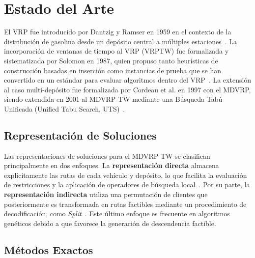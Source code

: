 \documentclass[letter, 10pt, dvipdfmx]{article}
\begin{document}
\section{Estado del Arte}

El VRP fue introducido por Dantzig y Ramser en 1959 en el contexto de la distribución de gasolina desde un depósito central a múltiples estaciones~\cite{Dantzig1959}.
La incorporación de ventanas de tiempo al VRP (VRPTW) fue formalizada y sistematizada por Solomon en 1987, quien propuso tanto heurísticas de construcción basadas en inserción
como instancias de prueba que se han convertido en un estándar para evaluar algoritmos dentro del VRP~\cite{Solomon1987}.
La extensión al caso multi-depósito fue formalizada por Cordeau et al. en 1997 con el MDVRP, siendo extendida en 2001 al MDVRP-TW mediante una Búsqueda Tabú Unificada (Unified Tabu Search, UTS)~\cite{Cordeau2001}.

\subsection{Representación de Soluciones}

Las representaciones de soluciones para el MDVRP-TW se clasifican principalmente en dos enfoques.
La \textbf{representación directa} almacena explícitamente las rutas de cada vehículo y depósito, lo que facilita la
evaluación de restricciones y la aplicación de operadores de búsqueda local~\cite{Cordeau2001}. Por su parte,
la \textbf{representación indirecta} utiliza una permutación de clientes que posteriormente es transformada en rutas
factibles mediante un procedimiento de decodificación, como \textit{Split}~\cite{VidalAG2013}. Este último enfoque es
frecuente en algoritmos genéticos debido a que favorece la generación de descendencia factible.

\subsection{Métodos Exactos}
\end{document}

